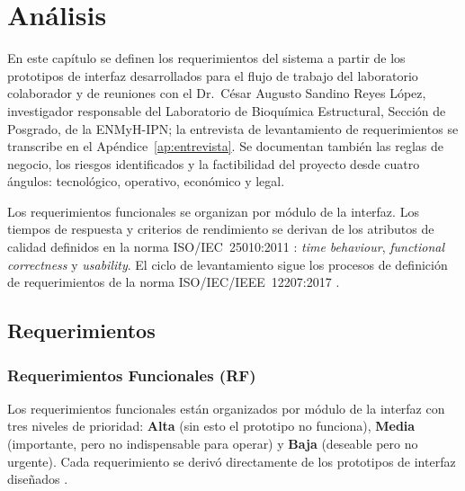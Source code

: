 
\chapter{Análisis}

En este capítulo se definen los requerimientos del sistema a partir de los prototipos
de interfaz desarrollados para el flujo de trabajo del laboratorio colaborador y de
reuniones con el Dr.\ César Augusto Sandino Reyes López, investigador responsable del Laboratorio de Bioquímica Estructural, Sección de Posgrado, de la ENMyH-IPN; la entrevista de levantamiento de requerimientos se transcribe en el Apéndice~\ref{ap:entrevista}. Se documentan
también las reglas de negocio, los riesgos identificados y la factibilidad del proyecto
desde cuatro ángulos: tecnológico, operativo, económico y legal.

Los requerimientos funcionales se organizan por módulo de la interfaz. Los tiempos de
respuesta y criterios de rendimiento se derivan de los atributos de calidad definidos
en la norma ISO/IEC~25010:2011 \cite{iso25010}: \textit{time behaviour},
\textit{functional correctness} y \textit{usability}. El ciclo de levantamiento sigue
los procesos de definición de requerimientos de la norma ISO/IEC/IEEE~12207:2017
\cite{iso12207}.

\section{Requerimientos}

\subsection{Requerimientos Funcionales (RF)}

Los requerimientos funcionales están organizados por módulo de la interfaz con tres
niveles de prioridad: \textbf{Alta} (sin esto el prototipo no funciona),
\textbf{Media} (importante, pero no indispensable para operar) y
\textbf{Baja} (deseable pero no urgente). Cada requerimiento se derivó directamente
de los prototipos de interfaz diseñados \cite{pressman2014,sommerville2011}.

